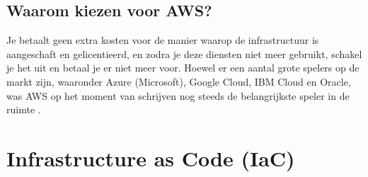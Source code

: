 \subsection{Waarom kiezen voor AWS?}
\label{Waarom kiezen voor AWS?}
Je betaalt geen extra kosten voor de manier waarop de infrastructuur is aangeschaft en gelicentieerd, 
en zodra je deze diensten niet meer gebruikt, schakel je het uit en betaal je er niet meer voor.
Hoewel er een aantal grote spelers op de markt zijn, waaronder Azure (Microsoft), Google Cloud, IBM Cloud en Oracle, 
was AWS op het moment van schrijven nog steeds de belangrijkste speler in de ruimte
\autocite{Sesto2022}.

\section{Infrastructure as Code (IaC)}

